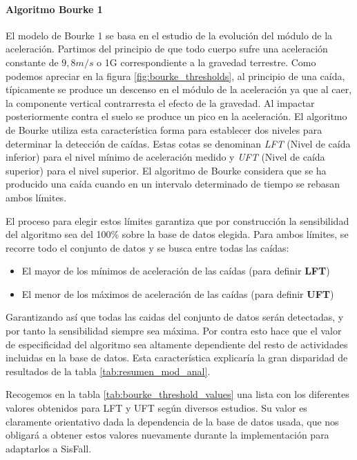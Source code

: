 \paragraph{Algoritmo Bourke 1} El modelo de Bourke 1\cite{Bourke2006} se basa en el estudio de la evolución del módulo de la aceleración. Partimos del principio de que todo cuerpo sufre una aceleración constante de $9,8m/s$ o 1G correspondiente a la gravedad terrestre. Como podemos apreciar en la figura \ref{fig:bourke_thresholds}, al principio de una caída, típicamente se produce un descenso en el módulo de la aceleración ya que al caer, la componente vertical contrarresta el efecto de la gravedad. Al impactar posteriormente contra el suelo se produce un pico en la aceleración. El algoritmo de Bourke utiliza esta característica forma para establecer dos niveles para determinar la detección de caídas. Estas cotas se denominan \textit{LFT} (Nivel de caída inferior) para el nivel mínimo de aceleración medido y \textit{UFT} (Nivel de caída superior) para el nivel superior. El algoritmo de Bourke considera que se ha producido una caída cuando en un intervalo determinado de tiempo se rebasan ambos límites.

El proceso para elegir estos límites garantiza que por construcción la sensibilidad del algoritmo sea del 100\% sobre la base de datos elegida. Para ambos límites, se recorre todo el conjunto de datos y se busca entre todas las caídas:
\begin{itemize}
  \item El mayor de los mínimos de aceleración de las caídas (para definir \textbf{LFT})
  \item El menor de los máximos de aceleración de las caídas (para definir \textbf{UFT})
\end{itemize}

Garantizando así que todas las caidas del conjunto de datos serán detectadas, y por tanto la sensibilidad siempre sea máxima. Por contra esto hace que el valor de especificidad del algoritmo sea altamente dependiente del resto de actividades incluidas en la base de datos. Esta característica explicaría la gran disparidad de resultados de la tabla \ref{tab:resumen_mod_anal}.


Recogemos en la tabla \ref{tab:bourke_threshold_values} una lista con los diferentes valores obtenidos para LFT y UFT según diversos estudios. Su valor es claramente orientativo dada la dependencia de la base de datos usada, que nos obligará a obtener estos valores nuevamente durante la implementación para adaptarlos a SisFall.

